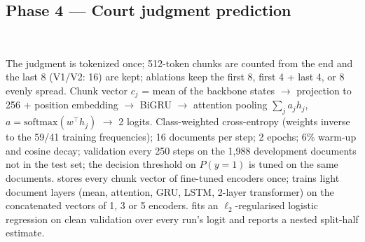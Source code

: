 \subsection{Phase 4 --- Court judgment prediction}
\begin{center}\\[2mm]
\end{center}
 The judgment is tokenized once; 512-token chunks are counted from the end and the last 8 (V1/V2: 16)
are kept; ablations keep the first 8, first 4 + last 4, or 8 evenly spread.
 Chunk vector $c_j$ = mean of the backbone states $\rightarrow$ projection to 256 + position embedding
$\rightarrow$ BiGRU $\rightarrow$ attention pooling $\sum_j a_j h_j$, $a=\mathrm{softmax}(w^\top h_j)$ $\rightarrow$ 2
logits.
 Class-weighted cross-entropy (weights inverse to the 59/41 training frequencies);
16 documents per step; 2 epochs; 6\% warm-up and cosine decay; validation every 250 steps on the 1,988
development documents not in the test set; the decision threshold on $P(y{=}1)$ is tuned on the same documents.
  stores every chunk vector of fine-tuned encoders once;
 trains light document layers (mean, attention, GRU, LSTM, 2-layer transformer) on the
concatenated vectors of 1, 3 or 5 encoders.   fits an $\ell_2$-regularised logistic
regression on clean validation over every run's logit and reports a nested split-half estimate.
\begin{center}\scriptsize{}\end{center}
